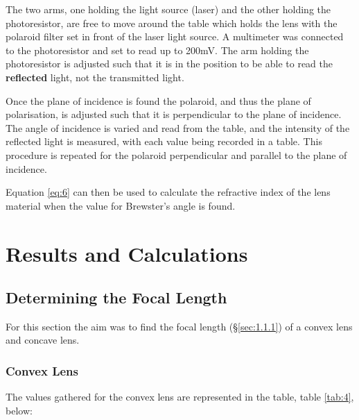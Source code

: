 \documentclass[12pt]{article}
\begin{document}
The two arms, one holding the light source (laser) and the other holding the photoresistor, are free to move around the table which holds the lens with the polaroid filter set in front of the laser light source.
A multimeter was connected to the photoresistor and set to read up to 200mV. The arm holding the photoresistor is adjusted such that it is in the position to be able to read the \textbf{reflected} 
light, not the transmitted light.

Once the plane of incidence is found the polaroid, and thus the plane of polarisation, is adjusted such that it is perpendicular to the plane of incidence.
The angle of incidence is varied and read from the table, and the intensity of the reflected light is measured, with each value being recorded in a table.
This procedure is repeated for the polaroid perpendicular and parallel to the plane of incidence.

Equation \ref{eq:6} can then be used to calculate the refractive index of the lens material when the value for Brewster's angle is found.

\vspace{2cm}

\section{Results and Calculations} \label{sec:3}

\subsection{Determining the Focal Length} \label{sec:3.1}

For this section the aim was to find the focal length (§\ref{sec:1.1.1}) of a convex lens and concave lens.

\subsubsection{Convex Lens} \label{sec:3.1.1}

The values gathered for the convex lens are represented in the table, table \ref{tab:4}, below:
\end{document}
